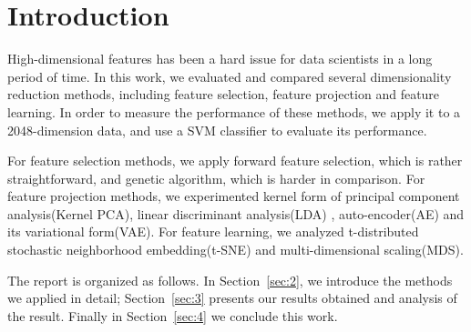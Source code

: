 \documentclass[journal]{IEEEtran}
\begin{document}




\maketitle



%
\IEEEpeerreviewmaketitle



\section{Introduction}
High-dimensional features has been a hard issue for data scientists in a long period of time. In this work, we evaluated and compared several dimensionality reduction methods, including feature selection, feature projection and feature learning. In order to measure the performance of these methods, we apply it to a 2048-dimension data, and use a SVM classifier to evaluate its performance.

For feature selection methods, we apply forward feature selection, which is rather straightforward, and genetic algorithm, which is harder in comparison. For feature projection methods, we experimented kernel form of principal component analysis(Kernel PCA), linear discriminant analysis(LDA) , auto-encoder(AE) and its variational form(VAE). For feature learning, we analyzed t-distributed stochastic neighborhood embedding(t-SNE) and multi-dimensional scaling(MDS).

The report is organized as follows. In Section~\ref{sec:2}, we introduce the methods we applied in detail; Section~\ref{sec:3} presents our results obtained and analysis of the result. Finally in Section~\ref{sec:4} we conclude this work.
\end{document}
